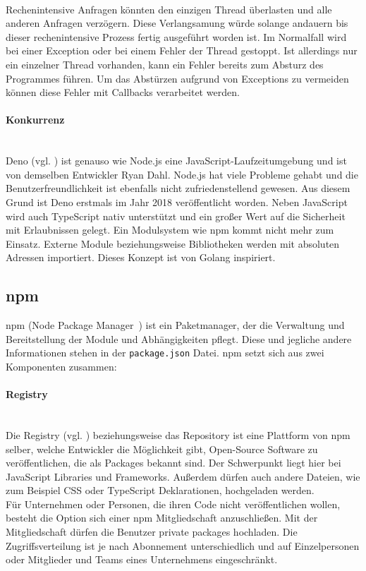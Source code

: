 \mbox{}\\
Rechenintensive Anfragen könnten den einzigen Thread überlasten und alle anderen Anfragen verzögern. Diese Verlangsamung würde solange andauern bis dieser rechenintensive Prozess fertig ausgeführt worden ist. Im Normalfall wird bei einer Exception oder bei einem Fehler der Thread gestoppt. Ist allerdings nur ein einzelner Thread vorhanden, kann ein Fehler bereits zum Absturz des Programmes führen. Um das Abstürzen aufgrund von Exceptions zu vermeiden können diese Fehler mit Callbacks verarbeitet werden.

\paragraph{Konkurrenz}
\mbox{}\\
Deno (vgl. \cite{deno_2021}) ist genauso wie Node.js eine JavaScript-Laufzeitumgebung und ist von demselben Entwickler Ryan Dahl. Node.js hat viele Probleme gehabt und die Benutzerfreundlichkeit ist ebenfalls nicht zufriedenstellend gewesen. Aus diesem Grund ist Deno erstmals im Jahr 2018 veröffentlicht worden. Neben JavaScript wird auch TypeScript nativ unterstützt und ein großer Wert auf die Sicherheit mit Erlaubnissen gelegt. Ein Modulsystem wie npm kommt nicht mehr zum Einsatz. Externe Module beziehungsweise Bibliotheken werden mit absoluten Adressen importiert. Dieses Konzept ist von Golang inspiriert.

\subsection{npm}
npm (Node Package Manager~\cite{npm_2021}) ist ein Paketmanager, der die Verwaltung und Bereitstellung der Module und Abhängigkeiten pflegt. Diese und jegliche andere Informationen stehen in der \texttt{package.json} Datei. npm setzt sich aus zwei Komponenten zusammen:

\paragraph{Registry}
\mbox{}\\
Die Registry (vgl. \cite{npm_registry_2021}) beziehungsweise das Repository ist eine Plattform von npm selber, welche Entwickler die Möglichkeit gibt, Open-Source Software zu veröffentlichen, die als Packages bekannt sind. Der Schwerpunkt liegt hier bei JavaScript Libraries und Frameworks. Außerdem dürfen auch andere Dateien, wie zum Beispiel CSS oder TypeScript Deklarationen, hochgeladen werden.
\\
Für Unternehmen oder Personen, die ihren Code nicht veröffentlichen wollen, besteht die Option sich einer npm Mitgliedschaft anzuschließen. Mit der Mitgliedschaft dürfen die Benutzer private packages hochladen. Die Zugriffsverteilung ist je nach Abonnement unterschiedlich und auf Einzelpersonen oder Mitglieder und Teams eines Unternehmens eingeschränkt.

